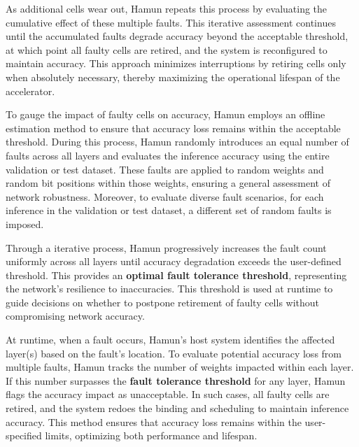 As additional cells wear out, Hamun repeats this process by evaluating the cumulative effect of these multiple faults. This iterative assessment continues until the accumulated faults degrade accuracy beyond the acceptable threshold, at which point all faulty cells are retired, and the system is reconfigured to maintain accuracy. This approach minimizes interruptions by retiring cells only when absolutely necessary, thereby maximizing the operational lifespan of the accelerator.

To gauge the impact of faulty cells on accuracy, Hamun employs an offline estimation method to ensure that accuracy loss remains within the acceptable threshold. During this process, Hamun randomly introduces an equal number of faults across all layers and evaluates the inference accuracy using the entire validation or test dataset. These faults are applied to random weights and random bit positions within those weights, ensuring a general assessment of network robustness. Moreover, to evaluate diverse fault scenarios, for each inference in the validation or test dataset, a different set of random faults is imposed.

Through a iterative process, Hamun progressively increases the fault count uniformly across all layers until accuracy degradation exceeds the user-defined threshold. This provides an \textbf{optimal fault tolerance threshold}, representing the network’s resilience to inaccuracies. This threshold is used at runtime to guide decisions on whether to postpone retirement of faulty cells without compromising network accuracy.

At runtime, when a fault occurs, Hamun’s host system identifies the affected layer(s) based on the fault’s location. To evaluate potential accuracy loss from multiple faults, Hamun tracks the number of weights impacted within each layer. If this number surpasses the \textbf{fault tolerance threshold} for any layer, Hamun flags the accuracy impact as unacceptable. In such cases, all faulty cells are retired, and the system redoes the binding and scheduling to maintain inference accuracy. This method ensures that accuracy loss remains within the user-specified limits, optimizing both performance and lifespan.
